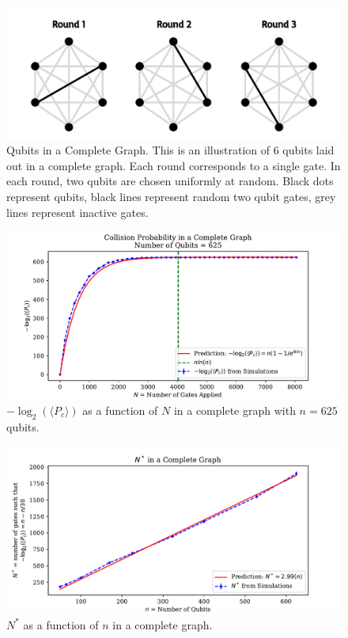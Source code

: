 \documentclass[11pt]{article}
\theoremstyle{definition}
\theoremstyle{plain}
\begin{document}
\begin{figure}[!htb]
\centering
\includegraphics[width=.8\textwidth]{figures/CG/CG_circuit.pdf}
\caption{Qubits in a Complete Graph. This is an illustration of 6 qubits laid out in a complete graph. Each round corresponds to a single gate. In each round, two qubits are chosen uniformly at random. Black dots represent qubits, black lines represent random two qubit gates, grey lines represent inactive gates. }
\label{fig_cg}
\end{figure}
\begin{figure}[!htb]
\centering
\includegraphics[width=.8\textwidth]{figures/CG/cp_mean_log.pdf}
\caption{$-\log_2(\langle P_c \rangle)$ as a function of $N$ in a complete graph with $n = 625$ qubits.}
\label{k_cg}
\end{figure}
\begin{figure}[!htb]
\centering
\includegraphics[width=.8\textwidth]{figures/CG/x_star_30.pdf}
\caption{$N^*$ as a function of $n$ in a complete graph.}
\label{N_star_cg} 
\end{figure}
\end{document}
